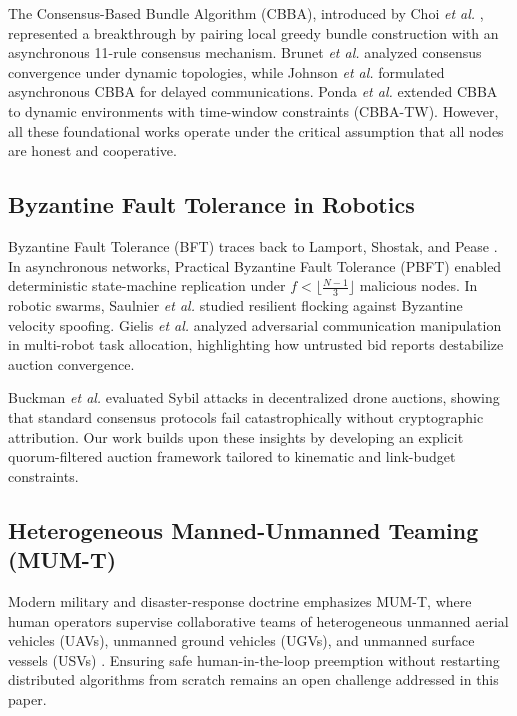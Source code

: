 \documentclass[journal,10pt,twocolumn]{IEEEtran}
\begin{document}
The Consensus-Based Bundle Algorithm (CBBA), introduced by Choi \textit{et al.} \cite{choi2009cbba}, represented a breakthrough by pairing local greedy bundle construction with an asynchronous 11-rule consensus mechanism. Brunet \textit{et al.} \cite{brunet2008consensus} analyzed consensus convergence under dynamic topologies, while Johnson \textit{et al.} \cite{johnson2017cbba_async} formulated asynchronous CBBA for delayed communications. Ponda \textit{et al.} \cite{ponda2010decentralized} extended CBBA to dynamic environments with time-window constraints (CBBA-TW). However, all these foundational works operate under the critical assumption that all nodes are honest and cooperative.

\subsection{Byzantine Fault Tolerance in Robotics}
Byzantine Fault Tolerance (BFT) traces back to Lamport, Shostak, and Pease \cite{lamport1982byzantine}. In asynchronous networks, Practical Byzantine Fault Tolerance (PBFT) \cite{castro1999practical} enabled deterministic state-machine replication under $f < \lfloor \frac{N-1}{3} \rfloor$ malicious nodes. In robotic swarms, Saulnier \textit{et al.} \cite{saulnier2017resilient} studied resilient flocking against Byzantine velocity spoofing. Gielis \textit{et al.} \cite{gielis2022tactical} analyzed adversarial communication manipulation in multi-robot task allocation, highlighting how untrusted bid reports destabilize auction convergence. 

Buckman \textit{et al.} \cite{buckman2020adversarial} evaluated Sybil attacks in decentralized drone auctions, showing that standard consensus protocols fail catastrophically without cryptographic attribution. Our work builds upon these insights by developing an explicit quorum-filtered auction framework tailored to kinematic and link-budget constraints.

\subsection{Heterogeneous Manned-Unmanned Teaming (MUM-T)}
Modern military and disaster-response doctrine emphasizes MUM-T, where human operators supervise collaborative teams of heterogeneous unmanned aerial vehicles (UAVs), unmanned ground vehicles (UGVs), and unmanned surface vessels (USVs) \cite{whitten2021decentralized, merrill2020distributed}. Ensuring safe human-in-the-loop preemption without restarting distributed algorithms from scratch remains an open challenge addressed in this paper.
\end{document}

